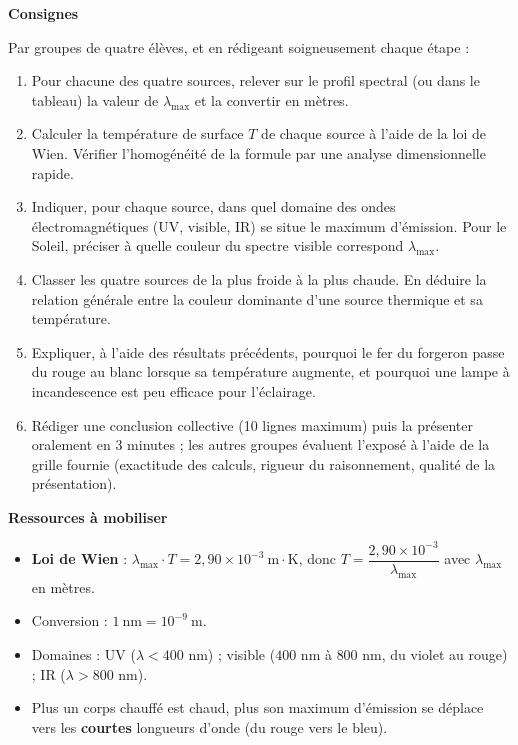 \documentclass[11pt]{article}
\begin{document}
\textbf{Consignes}

Par groupes de quatre élèves, et en rédigeant soigneusement chaque étape :
\begin{enumerate}
\item Pour chacune des quatre sources, relever sur le profil spectral (ou dans le tableau) la valeur de $\lambda_{\max}$ et la convertir en mètres.
\item Calculer la température de surface $T$ de chaque source à l'aide de la loi de Wien. Vérifier l'homogénéité de la formule par une analyse dimensionnelle rapide.
\item Indiquer, pour chaque source, dans quel domaine des ondes électromagnétiques (UV, visible, IR) se situe le maximum d'émission. Pour le Soleil, préciser à quelle couleur du spectre visible correspond $\lambda_{\max}$.
\item Classer les quatre sources de la plus froide à la plus chaude. En déduire la relation générale entre la couleur dominante d'une source thermique et sa température.
\item Expliquer, à l'aide des résultats précédents, pourquoi le fer du forgeron passe du rouge au blanc lorsque sa température augmente, et pourquoi une lampe à incandescence est peu efficace pour l'éclairage.
\item Rédiger une conclusion collective (10 lignes maximum) puis la présenter oralement en 3 minutes ; les autres groupes évaluent l'exposé à l'aide de la grille fournie (exactitude des calculs, rigueur du raisonnement, qualité de la présentation).
\end{enumerate}

\textbf{Ressources à mobiliser}

\begin{aretenir}
\begin{itemize}
\item \textbf{Loi de Wien} : $\lambda_{\max} \cdot T = 2{,}90 \times 10^{-3}\ \text{m}\cdot\text{K}$, donc $T = \dfrac{2{,}90 \times 10^{-3}}{\lambda_{\max}}$ avec $\lambda_{\max}$ en mètres.
\item Conversion : $1\ \text{nm} = 10^{-9}\ \text{m}$.
\item Domaines : UV ($\lambda < 400$ nm) ; visible ($400$ nm à $800$ nm, du violet au rouge) ; IR ($\lambda > 800$ nm).
\item Plus un corps chauffé est chaud, plus son maximum d'émission se déplace vers les \textbf{courtes} longueurs d'onde (du rouge vers le bleu).
\end{itemize}
\end{aretenir}
\end{document}
